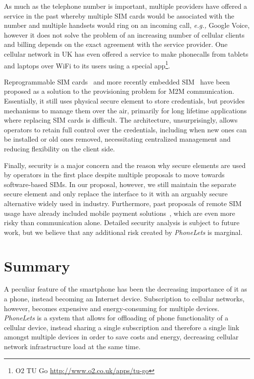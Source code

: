 \documentclass{sig-alternate-10pt}
\providecommand{\eg}{\emph{e.g.,} }
\begin{document}
As much as the telephone number is important, multiple providers have offered a service in the past whereby multiple SIM cards would be associated with the number and multiple handsets would ring on an incoming call, \eg Google Voice, however it does not solve the problem of an increasing number of cellular clients and billing depends on the exact agreement with the service provider. One cellular network in UK has even offered a service to make phonecalls from tablets and laptops over WiFi to its users using a special app\footnote{O2 TU Go \url{http://www.o2.co.uk/apps/tu-go}}.

Reprogrammable SIM cards~\cite{OFcom:2012tx} and more recently embedded SIM~\cite{Association:2013ub} have been proposed as a solution to the provisioning problem for M2M communication. Essentially, it still uses physical secure element to store credentials, but provides mechanisms to manage them over the air, primarily for long lifetime applications where replacing SIM cards is difficult. The architecture, unsurprisingly, allows operators to retain full control over the credentials, including when new ones can be installed or old ones removed, necessitating centralized management and reducing flexibility on the client side.

Finally, security is a major concern and the reason why secure elements are used by operators in the first place despite multiple proposals to move towards software-based SIMs. In our proposal, however, we still maintain the separate secure element and only replace the interface to it with an arguably secure alternative widely used in industry. Furthermore, past proposals of remote SIM usage have already included mobile payment solutions~\cite{subramanian2003sim}, which are even more risky than communication alone. Detailed security analysis is subject to future work, but we believe that any additional risk created by \emph{PhoneLets} is marginal.

\section{Summary}

A peculiar feature of the smartphone has been the decreasing importance of it as a phone, instead becoming an Internet device. Subscription to cellular networks, however, becomes expensive and energy-consuming for multiple devices. \emph{PhoneLets} is a system that allows for offloading of phone functionality of a cellular device, instead sharing a single subscription and therefore a single link amongst multiple devices in order to save costs and energy, decreasing cellular network infrastructure load at the same time.
\end{document}
